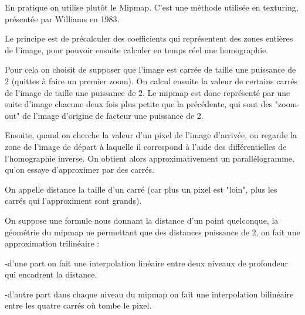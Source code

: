 




En pratique on utilise plutôt le Mipmap. C'est une méthode utilisée en texturing, présentée par Williams en 1983.


Le principe est de précalculer des coefficients qui représentent des zones entières de l'image, pour pouvoir ensuite calculer en temps réel une homographie. 

Pour cela on choisit de supposer que l'image est carrée de taille une puissance de 2 (quittes à faire un premier zoom). On calcul ensuite la valeur de certains carrés de l'image de taille une puissance de 2.
Le mipmap est donc représenté par une suite d'image chacune deux fois plus petite que la précédente, qui sont des "zoom-out" de l'image d'origine de facteur une puissance de 2.


Ensuite, quand on cherche la valeur d'un pixel de l'image d'arrivée, on regarde la zone de l'image de départ à laquelle il correspond à l'aide des différentielles de l'homographie inverse. On obtient alors approximativement un parallélogramme, qu'on essaye d'approximer par des carrés.


On appelle distance la taille d'un carré (car plus un pixel est "loin", plus les carrés qui l'approximent sont grands). 

On suppose une formule nous donnant la distance d'un point quelconque, la géométrie du mipmap ne permettant que des distances puissance de 2, on fait une approximation trilinéaire : 

-d'une part on fait une interpolation linéaire entre deux niveaux de profondeur qui encadrent la distance.

-d'autre part dans chaque niveau du mipmap on fait une interpolation bilinéaire entre les quatre carrés où tombe le pixel.

